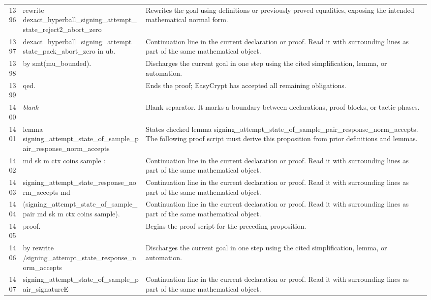 \documentclass[10pt]{article}
\begin{document}
\begin{longtable}{r L{0.53\textwidth} L{0.37\textwidth}}
1396 & {\ttfamily\scriptsize rewrite dexact\_hyperball\_signing\_attempt\_state\_reject2\_abort\_zero} & Rewrites the goal using definitions or previously proved equalities, exposing the intended mathematical normal form. \\
1397 & {\ttfamily\scriptsize         dexact\_hyperball\_signing\_attempt\_state\_pack\_abort\_zero in ub.} & Continuation line in the current declaration or proof.  Read it with surrounding lines as part of the same mathematical object. \\
1398 & {\ttfamily\scriptsize by smt(mu\_bounded).} & Discharges the current goal in one step using the cited simplification, lemma, or automation. \\
1399 & {\ttfamily\scriptsize qed.} & Ends the proof; EasyCrypt has accepted all remaining obligations. \\
1400 & {\ttfamily\scriptsize \emph{blank}} & Blank separator.  It marks a boundary between declarations, proof blocks, or tactic phases. \\
1401 & {\ttfamily\scriptsize lemma signing\_attempt\_state\_of\_sample\_pair\_response\_norm\_accepts} & States checked lemma signing\_attempt\_state\_of\_sample\_pair\_response\_norm\_accepts.  The following proof script must derive this proposition from prior definitions and lemmas. \\
1402 & {\ttfamily\scriptsize    md sk m ctx coins sample :} & Continuation line in the current declaration or proof.  Read it with surrounding lines as part of the same mathematical object. \\
1403 & {\ttfamily\scriptsize   signing\_attempt\_state\_response\_norm\_accepts md} & Continuation line in the current declaration or proof.  Read it with surrounding lines as part of the same mathematical object. \\
1404 & {\ttfamily\scriptsize     (signing\_attempt\_state\_of\_sample\_pair md sk m ctx coins sample).} & Continuation line in the current declaration or proof.  Read it with surrounding lines as part of the same mathematical object. \\
1405 & {\ttfamily\scriptsize proof.} & Begins the proof script for the preceding proposition. \\
1406 & {\ttfamily\scriptsize by rewrite /signing\_attempt\_state\_response\_norm\_accepts} & Discharges the current goal in one step using the cited simplification, lemma, or automation. \\
1407 & {\ttfamily\scriptsize            signing\_attempt\_state\_of\_sample\_pair\_signatureE} & Continuation line in the current declaration or proof.  Read it with surrounding lines as part of the same mathematical object. \\

\end{longtable}
\end{document}

